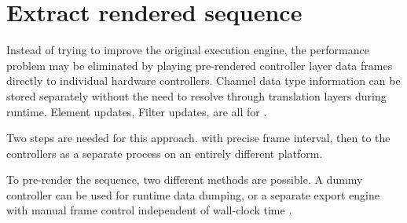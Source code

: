 \section{Extract rendered sequence}

Instead of trying to improve the original execution engine, the performance problem may be eliminated by playing pre-rendered controller layer data frames directly to individual hardware controllers. Channel data type information can be stored separately without the need to resolve through translation layers during runtime. Element updates, Filter updates,  are all  for .

Two steps are needed for this approach.  with precise frame interval, then  to the controllers as a separate process on an entirely different platform.

To pre-render the sequence, two different methods are possible. A dummy controller can be used for runtime data dumping, or a separate export engine with manual frame control independent of wall-clock time . 
